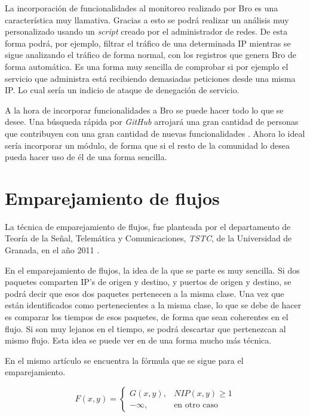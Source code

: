 La incorporación de funcionalidades al monitoreo realizado por Bro es una característica muy llamativa. Gracias 
a esto se podrá realizar un análisis muy personalizado usando un \textit{script} creado por el administrador de redes. De 
esta forma podrá, por ejemplo, filtrar el tráfico de una determinada IP mientras se sigue analizando el tráfico 
de forma normal, con los registros que genera Bro de forma automática. Es una forma muy sencilla de comprobar 
si por ejemplo el servicio que administra está recibiendo demasiadas peticiones desde una misma IP. Lo cual 
sería un indicio de ataque de denegación de servicio.

\intro A la hora de incorporar funcionalidades a Bro se puede hacer todo lo que se desee. Una búsqueda rápida 
por \textit{GitHub} arrojará una gran cantidad de personas que contribuyen con una gran cantidad de nuevas 
funcionalidades \citep{gitbeacon}. Ahora lo ideal sería incorporar un módulo, de forma que si el resto 
de la comunidad lo desea pueda hacer uso de él de una forma sencilla.

\section{Emparejamiento de flujos}

La técnica de emparejamiento de flujos, fue planteada por el departamento de Teoría de la Señal, 
Telemática y Comunicaciones, \textit{TSTC}, de la Universidad de Granada, en el año 2011 \cite{presentacion} \cite{comparacion}. 

\intro En el emparejamiento de flujos, la idea de la que se parte es muy sencilla. Si dos paquetes comparten 
IP's de origen y destino, y puertos de origen y destino, se podrá decir que esos dos paquetes pertenecen a 
la misma clase. Una vez que están identificados como pertenecientes a la misma clase, lo que se debe de hacer 
es comparar los tiempos de esos paquetes, de forma que sean coherentes en el flujo. Si son muy lejanos en el 
tiempo, se podrá descartar que pertenezcan al mismo flujo. Esta idea se puede ver en \cite{comparacion} de una 
forma mucho más técnica.

\intro En el mismo artículo \cite{comparacion} se encuentra la fórmula que se sigue para el emparejamiento.

\begin{equation*}
	F(x,y)=
 	\begin{cases}
	  G(x,y), & NIP(x,y) \geq 1 \\
	  -\infty, & \text{en otro caso}
	 \end{cases}
\end{equation*}

